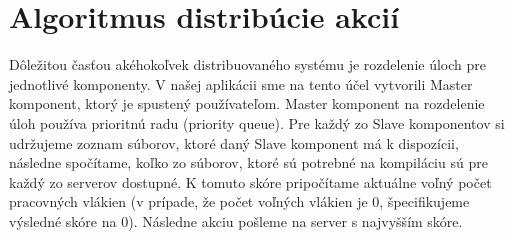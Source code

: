 \section{Algoritmus distrib\'{u}cie akci\'{i}}
\label{sec:actiondistrib}

Dôležitou časťou akéhokoľvek distribuovaného systému je rozdelenie úloch pre jednotlivé
komponenty. V našej aplikácii sme na tento účel vytvorili Master komponent, ktorý
je spustený používateľom. Master komponent na rozdelenie úloh používa prioritnú radu
(priority queue). Pre každý zo Slave komponentov si udržujeme zoznam súborov, ktoré
daný Slave komponent má k dispozícii, následne spočítame, koľko zo súborov, ktoré
sú potrebné na kompiláciu sú pre každý zo serverov dostupné. K tomuto skóre pripočítame
aktuálne voľný počet pracovných vlákien (v prípade, že počet voľných vlákien je 0, špecifikujeme
  výsledné skóre na 0). Následne akciu pošleme na server s najvyšším skóre.
